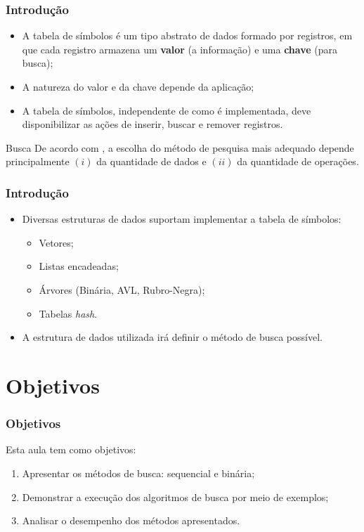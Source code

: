 \documentclass[aspectratio=169]{beamer}
\begin{document}

\begin{frame}
\frametitle{Introdução}
\begin{itemize}
\item A tabela de símbolos é um tipo abstrato de dados formado por registros, em que cada registro armazena um {\bf valor} (a informação) e uma {\bf chave} (para busca);
\item A natureza do valor e da chave depende da aplicação;
\item A tabela de símbolos, independente de como é implementada, deve disponibilizar as ações de inserir, buscar e remover registros.
\end{itemize}
\begin{block}{Busca}
 De acordo com , a escolha do método de pesquisa mais adequado depende principalmente $(i)$ da quantidade de dados e $(ii)$ da quantidade de operações. 
\end{block}
\end{frame}


\begin{frame}
\frametitle{Introdução}
\begin{itemize}
\item Diversas estruturas de dados suportam implementar a tabela de símbolos:
  \begin{itemize}
   \item Vetores;
   \item Listas encadeadas;
   \item Árvores (Binária, AVL, Rubro-Negra);
   \item Tabelas {\it hash}.
  \end{itemize}
\item A estrutura de dados utilizada irá definir o método de busca possível.
\end{itemize}
\end{frame}

\section{Objetivos}

\begin{frame}
\frametitle{Objetivos}

Esta aula tem como objetivos:

\begin{enumerate}
\item Apresentar os métodos de busca: sequencial e binária;
\item Demonstrar a execução dos algoritmos de busca por meio de exemplos;
\item Analisar o desempenho dos métodos apresentados.
\end{enumerate}

\end{frame}
\end{document}
